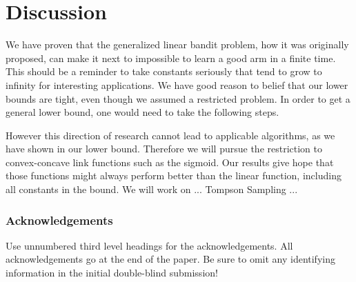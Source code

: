 \documentclass[twoside]{article} \usepackage{aistats2017}
\begin{document}
\section{Discussion}
We have proven that the generalized linear bandit problem, how it was originally proposed, can make it next to impossible to learn a good arm in a finite time. This should be a reminder to take constants seriously that tend to grow to infinity for interesting applications. We have good reason to belief that our lower bounds are tight, even though we assumed a restricted problem. In order to get a general lower bound, one would need to take the following steps.
However this direction of research cannot lead to applicable algorithms, as we have shown in our lower bound. Therefore we will pursue the restriction to convex-concave link functions such as the sigmoid. Our results give hope that those functions might always perform better than the linear function, including all constants in the bound. We will work on ... Tompson Sampling ... 



\newpage



\subsubsection*{Acknowledgements}

Use unnumbered third level headings for the acknowledgements.  All
acknowledgements go at the end of the paper.  Be sure to omit any
identifying information in the initial double-blind submission!






\newpage
\end{document}

